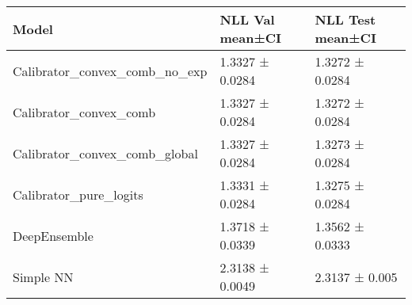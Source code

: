 \begin{tabular}{lll}
\toprule
Model & NLL Val mean±CI & NLL Test mean±CI \\
\midrule
Calibrator_convex_comb_no_exp & 1.3327 ± 0.0284 & 1.3272 ± 0.0284 \\
Calibrator_convex_comb & 1.3327 ± 0.0284 & 1.3272 ± 0.0284 \\
Calibrator_convex_comb_global & 1.3327 ± 0.0284 & 1.3273 ± 0.0284 \\
Calibrator_pure_logits & 1.3331 ± 0.0284 & 1.3275 ± 0.0284 \\
DeepEnsemble & 1.3718 ± 0.0339 & 1.3562 ± 0.0333 \\
Simple NN & 2.3138 ± 0.0049 & 2.3137 ± 0.005 \\
\bottomrule
\end{tabular}
